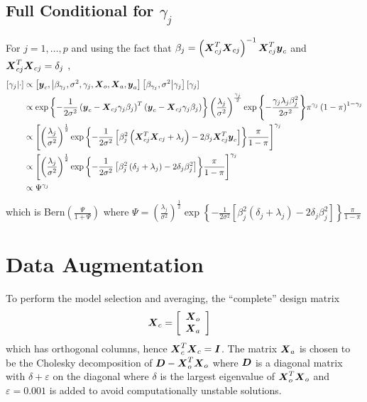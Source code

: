 \documentclass[fleqn]{article}
\def\bm#1{\mbox{\boldmath $#1$}}
\begin{document}
\subsection{Full Conditional for $\gamma_j$}
%
For $j = 1, \ldots, p$ and using the fact that $\beta_j = \left( \bm{X}_{c j}^T \bm{X}_{c j} \right)^{ - 1} \bm{X}_{c j}^T \bm{y}_c$ and $\bm{X}_{c j}^T \bm{X}_{c j} = \delta_j$ 
,
%
\begin{align*}
%
\left[ \gamma_j \middle| \cdot \right] & \propto \left[ \bm{y}_c, \middle| \beta_{\gamma_j}, \sigma^2, \gamma_j, \bm{X}_o, \bm{X}_a, \bm{y}_a \right] \left[ \beta_{\gamma_j}, \sigma^2 \middle| \gamma_j \right] \left[ \gamma_j \right] \\
%
& \propto \exp{ \left\{ - \frac{1} {2 \sigma^2} \left( \bm{y}_c - \bm{X}_{c j} \gamma_j \beta_j \right)^T \left( \bm{y}_c - \bm{X}_{c j} \gamma_j \beta_j \right) \right\} } \left( \frac{\lambda_j} {\sigma^2} \right)^{ \frac{\gamma_j} {2} } \exp{ \left\{ - \frac{\gamma_j \lambda_j \beta_j^2} {2 \sigma^2} \right\} } \pi^{\gamma_j} \left( 1 - \pi \right)^{1 - \gamma_j} \\
%
& \propto \left[ \left( \frac{\lambda_j} {\sigma^2} \right)^{ \frac{1} {2} } \exp{ \left\{ - \frac{1} {2 \sigma^2} \left[ \beta_j^2 \left( \bm{X}_{c j}^T \bm{X}_{c j} + \lambda_j \right) - 2 \beta_j \bm{X}_{c j}^T \bm{y}_c \right] \right\} } \frac{\pi} {1 - \pi }\right]^{\gamma_j} \\
%
& \propto \left[ \left( \frac{\lambda_j} {\sigma^2} \right)^{ \frac{1} {2} } \exp{ \left\{ - \frac{1} {2 \sigma^2} \left[ \beta_j^2 \left( \delta_j + \lambda_j \right) - 2 \delta_j \beta_j^2 \right] \right\} } \frac{\pi} {1 - \pi } \right]^{\gamma_j} \\
%
& \propto \Psi^{\gamma_j}
%
\end{align*}
%
which is Bern$\left( \frac{\Psi} {1 + \Psi} \right)$ where $\Psi =  \left( \frac{\lambda_j} {\sigma^2} \right)^{ \frac{1} {2} } \exp{ \left\{ - \frac{1} {2 \sigma^2} \left[ \beta_j^2 \left( \delta_j + \lambda_j \right) - 2 \delta_j \beta_j^2 \right] \right\} } \frac{\pi} {1 - \pi }$
%
\section{Data Augmentation}
To perform the model selection and averaging, the ``complete'' design matrix
%
\begin{align*}
%
\bm{X}_c & = \left[ \begin{array}{c} \bm{X}_o \\ \bm{X}_a \end{array} \right]
%
\end{align*}
%
which has orthogonal columns, hence $\bm{X}_c^T \bm{X}_c = \bm{I}$. The matrix $\bm{X}_a$ is chosen to be the Cholesky decomposition of $\bm{D} - \bm{X}_o^T \bm{X}_o$ where $\bm{D}$ is a diagonal matrix with $\delta + \varepsilon$ on the diagonal where $\delta$ is the largest eigenvalue of $\bm{X}_o^T \bm{X}_o$ and $\varepsilon = 0.001$ is added to avoid computationally unstable solutions.
\end{document}
